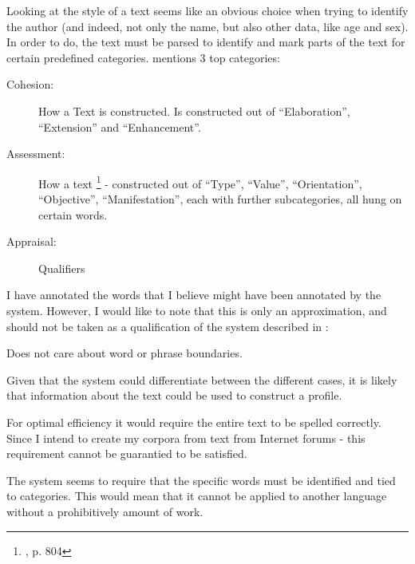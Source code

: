 {\label{stylistic}
Looking at the style of a text seems like an obvious choice when trying to identify the author (and indeed, not only the name, but also other data, like age and sex). In order to do, the text must be parsed to identify and mark parts of the text for certain predefined categories. \cite{style} mentions 3 top categories: 
\begin{description}
\item[Cohesion:] How a Text is constructed. Is constructed out of ``Elaboration'', ``Extension'' and ``Enhancement''.
\item[Assessment:] How a text \footnote{\cite{style}, p. 804} - constructed out of  ``Type'', ``Value'', ``Orientation'', ``Objective'', ``Manifestation'', each with further subcategories, all hung on certain words.
\item[Appraisal:] Qualifiers
\end{description}
}
{
I have annotated the words that I believe might have been annotated by the system. However, I would like to note that this is only an approximation, and should not be taken as a qualification of the system described in \cite{style}:\\
}  
{
\item Does not care about word or phrase boundaries.
\item Given that the system could differentiate between the different cases, it is likely that information about the text could be used to construct a profile.
}{
\item For optimal efficiency it would require the entire text to be spelled correctly. Since I intend to create my corpora from text from Internet forums - this requirement cannot be guarantied to be satisfied.
\item The system seems to require that the specific words must be identified and tied to categories. This would mean that it cannot be applied to another language without a prohibitively amount of work.
} 

